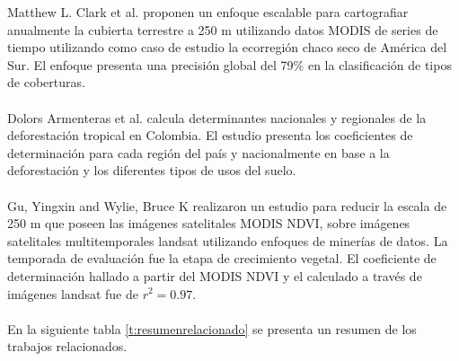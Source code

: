 Matthew L. Clark et al. \cite{clark2010scalable} proponen un enfoque escalable para cartografiar anualmente la cubierta terrestre a 250 m utilizando datos MODIS de series de tiempo utilizando como caso de estudio la ecorregi\'on chaco seco de Am\'erica del Sur. El enfoque presenta una precisi\'on global del 79\% en la clasificaci\'on de tipos de coberturas.\\~\\
Dolors Armenteras et al. \cite{armenteras2013national} calcula determinantes nacionales y regionales de la deforestaci\'on tropical en Colombia. El estudio presenta los coeficientes de determinaci\'on para cada regi\'on del pa\'is y nacionalmente en base a la deforestaci\'on y los diferentes tipos de usos del suelo.\\~\\
Gu, Yingxin and Wylie, Bruce K \cite{gu2015downscaling} realizaron un estudio para reducir la escala de 250 m que poseen las im\'agenes satelitales MODIS NDVI, sobre im\'agenes satelitales multitemporales landsat utilizando enfoques de miner\'ias de datos. La temporada de evaluaci\'on fue la etapa de crecimiento vegetal. El coeficiente de determinaci\'on hallado a partir del MODIS NDVI y el calculado a trav\'es de im\'agenes landsat fue de $ r^{2}=0.97 $.\\~\\
En la siguiente tabla \ref{t:resumenrelacionado} se presenta un resumen de los trabajos relacionados.
